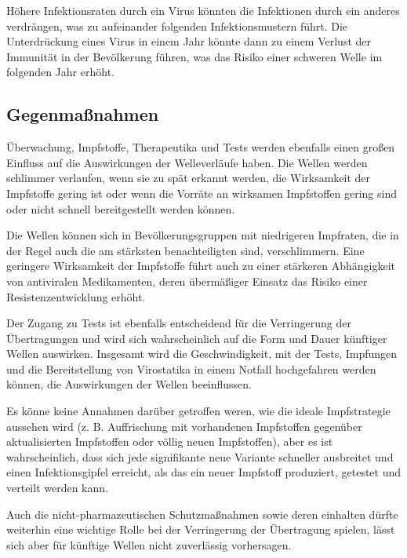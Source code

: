 \documentclass{article}
\begin{document}
Höhere Infektionsraten durch ein Virus könnten die Infektionen durch ein anderes verdrängen, was zu aufeinander folgenden Infektionsmustern führt. Die Unterdrückung eines Virus in einem Jahr könnte dann zu einem Verlust der Immunität in der Bevölkerung führen, was das Risiko einer schweren Welle im folgenden Jahr erhöht.


\subsection{Gegenmaßnahmen}\label{H976262}



Überwachung, Impfstoffe, Therapeutika und Tests werden ebenfalls einen großen Einfluss auf die Auswirkungen der Welleverläufe haben. Die Wellen werden schlimmer verlaufen, wenn sie zu spät erkannt werden, die Wirksamkeit der Impfstoffe gering ist oder wenn die Vorräte an wirksamen Impfstoffen gering sind oder nicht schnell bereitgestellt werden können. 


Die Wellen können sich in Bevölkerungsgruppen mit niedrigeren Impfraten, die in der Regel auch die am stärksten benachteiligten sind, verschlimmern. Eine geringere Wirksamkeit der Impfstoffe führt auch zu einer stärkeren Abhängigkeit von antiviralen Medikamenten, deren übermäßiger Einsatz das Risiko einer Resistenzentwicklung erhöht. 


Der Zugang zu Tests ist ebenfalls entscheidend für die Verringerung der Übertragungen und wird sich wahrscheinlich auf die Form und Dauer künftiger Wellen auswirken. Insgesamt wird die Geschwindigkeit, mit der Tests, Impfungen und die Bereitstellung von Virostatika in einem Notfall hochgefahren werden können, die Auswirkungen der Wellen beeinflussen. 


Es könne keine Annahmen darüber getroffen weren, wie die ideale Impfstrategie aussehen wird (z. B. Auffrischung mit vorhandenen Impfstoffen gegenüber aktualisierten Impfstoffen oder völlig neuen Impfstoffen), aber es ist wahrscheinlich, dass sich jede signifikante neue Variante schneller ausbreitet und einen Infektionsgipfel erreicht, als das ein neuer Impfstoff produziert, getestet und verteilt werden kann. 


Auch die nicht-pharmazeutischen Schutzmaßnahmen sowie deren einhalten dürfte weiterhin eine wichtige Rolle bei der Verringerung der Übertragung spielen, lässt sich aber für künftige Wellen nicht zuverlässig vorhersagen.
\end{document}
